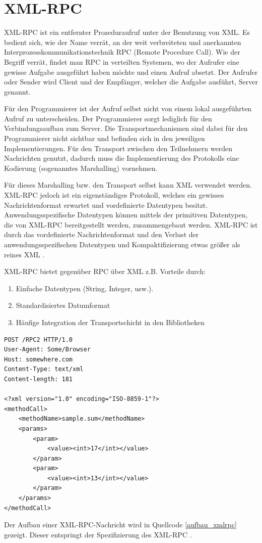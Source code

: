 \section{XML-RPC}
\label{gru_xmlrpc}

XML-RPC ist ein entfernter Prozeduraufruf unter der Benutzung von XML.
Es bedient sich, wie der Name verrät, an der weit verbreiteten und anerkannten Interprozesskommunikationstechnik
RPC (Remote Procedure Call).
Wie der Begriff verrät, findet man RPC in verteilten Systemen, wo der Aufrufer eine gewisse
Aufgabe ausgeführt haben möchte und einen Aufruf absetzt.
Der Aufrufer oder Sender wird Client und der Empfänger, welcher die Aufgabe ausführt, Server genannt.

Für den Programmierer ist der Aufruf selbst nicht von einem lokal ausgeführten Aufruf zu unterscheiden.
Der Programmierer sorgt lediglich für den Verbindungsaufbau zum Server.
Die Transportmechanismen sind dabei für den Programmierer nicht sichtbar und befinden sich in den jeweiligen
Implementierungen.
Für den Transport zwischen den Teilnehmern werden Nachrichten genutzt, dadurch muss die Implementierung
des Protokolls eine Kodierung (sogenanntes Marshalling) vornehmen.

Für dieses Marshalling bzw. den Transport selbst kann XML verwendet werden.
XML-RPC jedoch ist ein eigenständiges Protokoll, welches ein gewisses Nachrichtenformat erwartet und vordefinierte
Datentypen besitzt.
Anwendungsspezifische Datentypen können mittels der primitiven Datentypen, die von XML-RPC bereitgestellt werden,
zusammengebaut werden.
XML-RPC ist durch das vordefinierte Nachrichtenformat und den Verlust der anwendungsspezifischen Datentypen
und Kompaktifizierung etwas größer als reines XML \cite{xmlrpc_so}.

XML-RPC bietet gegenüber RPC über XML z.B. Vorteile durch:
\begin{enumerate}
\item Einfache Datentypen (String, Integer, usw.).
\item Standardisiertes Datumformat
\item Häufige Integration der Transportschicht in den Bibliotheken
\end{enumerate}
\lstset{language=XML}
\begin{lstlisting}[frame=single,caption={Aufbau einer XML-RPC-Nachricht},label={aufbau_xmlrpc}]
POST /RPC2 HTTP/1.0
User-Agent: Some/Browser
Host: somewhere.com
Content-Type: text/xml
Content-length: 181

<?xml version="1.0" encoding="ISO-8859-1"?>
<methodCall>
	<methodName>sample.sum</methodName>
	<params>
		<param>
			<value><int>17</int></value>
		</param>
		<param>
			<value><int>13</int></value>
		</param>
	</params>
</methodCall>
\end{lstlisting}
Der Aufbau einer XML-RPC-Nachricht wird in Quellcode \ref{aufbau_xmlrpc} gezeigt.
Dieser entspringt der Spezifizierung des XML-RPC \cite{xmlrpc}.

